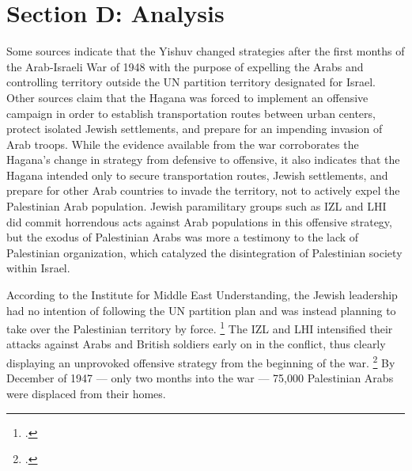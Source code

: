 \documentclass[11pt]{turabian-researchpaper}
\begin{document}

\section{Section D: Analysis}

Some sources indicate that the Yishuv changed strategies after the first months of the Arab-Israeli War of 1948 with the purpose of expelling the Arabs and controlling territory outside the UN partition territory designated for Israel.  Other sources claim that the Hagana was forced to implement an offensive campaign in order to establish transportation routes between urban centers, protect isolated Jewish settlements, and prepare for an impending invasion of Arab troops.
While the evidence available from the war corroborates the Hagana's change in strategy from defensive to offensive, it also indicates that the Hagana intended only to secure transportation routes, Jewish settlements, and prepare for other Arab countries to invade the territory, not to actively expel the Palestinian Arab population.  Jewish paramilitary groups such as IZL and LHI did commit horrendous acts against Arab populations in this offensive strategy, but the exodus of Palestinian Arabs was more a testimony to the lack of Palestinian organization, which catalyzed the disintegration of Palestinian society within Israel.


According to the Institute for Middle East Understanding, the Jewish leadership had no intention of following the UN partition plan and was instead planning to take over the Palestinian territory by force.
\footcite{nabka}
The IZL and LHI intensified their attacks against Arabs and British soldiers early on in the conflict, thus clearly displaying an unprovoked offensive strategy from the beginning of the war.
\footcite{nabka}
By December of 1947 --- only two months into the war --- 75,000 Palestinian Arabs were displaced from their homes.
\end{document}
